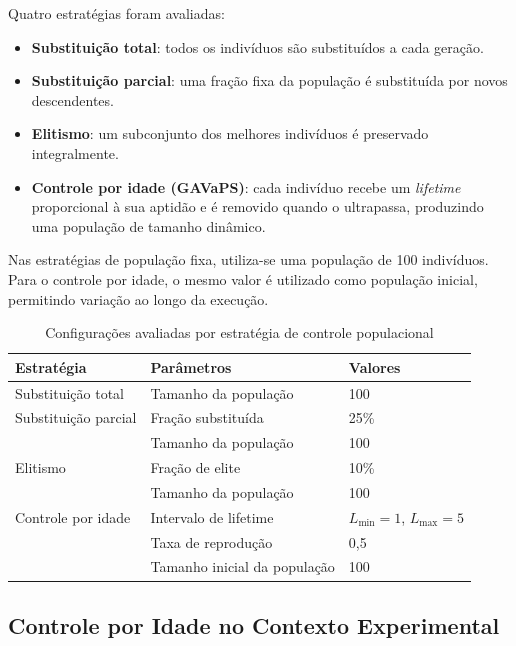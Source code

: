 Quatro estratégias foram avaliadas:

\begin{itemize}
    \item \textbf{Substituição total}: todos os indivíduos são substituídos a cada geração.
    \item \textbf{Substituição parcial}: uma fração fixa da população é substituída por novos descendentes.
    \item \textbf{Elitismo}: um subconjunto dos melhores indivíduos é preservado integralmente.
    \item \textbf{Controle por idade (GAVaPS)}: cada indivíduo recebe um \textit{lifetime} proporcional à sua aptidão e é removido quando o ultrapassa, produzindo uma população de tamanho dinâmico.
\end{itemize}

Nas estratégias de população fixa, utiliza-se uma população de 100 indivíduos.  
Para o controle por idade, o mesmo valor é utilizado como população inicial, permitindo variação ao longo da execução.

\begin{table}[h!]
\centering
\caption{Configurações avaliadas por estratégia de controle populacional}
\label{tab:estrategias}
\begin{tabular}{@{}lll@{}}
\toprule
\textbf{Estratégia}        & \textbf{Parâmetros}       & \textbf{Valores} \\ 
\midrule
Substituição total         & Tamanho da população      & 100 \\ 
\midrule
Substituição parcial       & Fração substituída        & 25\% \\
                           & Tamanho da população      & 100 \\ 
\midrule
Elitismo                   & Fração de elite           & 10\% \\
                           & Tamanho da população      & 100 \\ 
\midrule
Controle por idade         & Intervalo de lifetime     & $L_{\min}=1$, $L_{\max}=5$ \\
                           & Taxa de reprodução        & 0{,}5 \\
                           & Tamanho inicial da população & 100 \\ 
\bottomrule
\end{tabular}
\end{table}

\subsection{Controle por Idade no Contexto Experimental}

